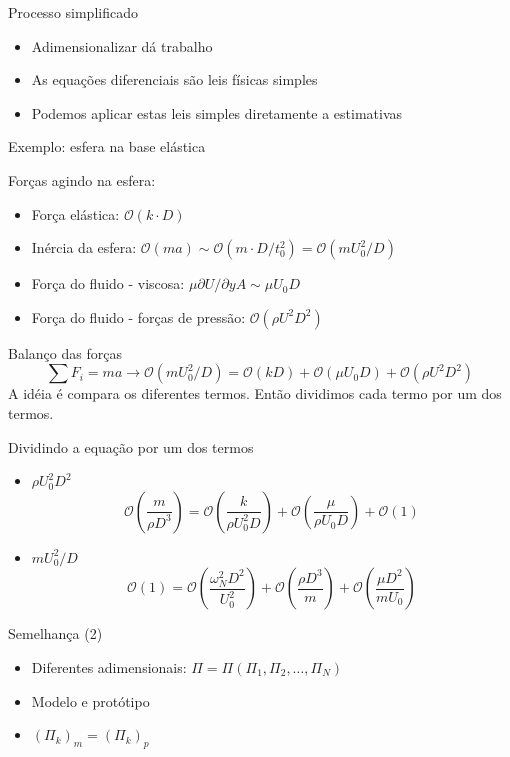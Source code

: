 \documentclass{beamer}
\newcommand{\lra}{\ensuremath{\longrightarrow}}
\newcommand{\bigO}[1]{\ensuremath{\mathcal{O}\left(#1\right)}}
\begin{document}
\begin{frame}{Processo simplificado}
  \begin{itemize}
  \item Adimensionalizar dá trabalho
  \item As equações diferenciais são leis físicas simples
  \item Podemos aplicar estas leis simples diretamente a estimativas
\end{itemize}
  
\end{frame}
\begin{frame}{Exemplo: esfera na base elástica}

  Forças agindo na esfera:
  \begin{itemize}
  \item Força elástica: $\bigO{k\cdot D}$
  \item Inércia da esfera: $\bigO{ma} \sim \bigO{m\cdot D/t_0^2} = \bigO{mU_0^2/D}$
  \item Força do fluido - viscosa: $\mu\partial U / \partial y A \sim \mu U_0 D$
  \item Força do fluido - forças de pressão: $\bigO{\rho U^2 D^2}$
  \end{itemize}
  
  Balanço das forças
  \[
  \sum F_i = ma \lra \bigO{m U_0^2 / D} = \bigO{k D}  + \bigO{\mu U_0 D} + \bigO{\rho U^2 D^2}
  \]
  A idéia é compara os diferentes termos. Então dividimos cada termo por um dos termos.
\end{frame}
\begin{frame}{Dividindo a equação por um dos termos}
  \begin{itemize}
  \item $\rho U_0^2 D^2$
    \[
    \bigO{\frac{m}{\rho D^3}}  = \bigO{\frac{k}{\rho U_0^2 D}}+  \bigO{\frac{\mu}{\rho U_0 D}} + \bigO{1}
    \]
  \item $mU_0^2/D$
    \[
\bigO{1} = \bigO{\frac{\omega_N^2 D^2}{U_0^2}} + \bigO{\frac{\rho D^3}{m}} + \bigO{\frac{\mu D^2}{m U_0}}
\]
\end{itemize}
\end{frame}

\begin{frame}{Semelhança (2)}

  \begin{itemize}
  \item Diferentes adimensionais: $\Pi = \Pi\left(\Pi_1, \Pi_2, \ldots, \Pi_N\right)$
  \item Modelo e protótipo
  \item $\left(\Pi_k\right)_m = \left(\Pi_k\right)_p$
  \end{itemize}

  
\end{frame}
\end{document}
